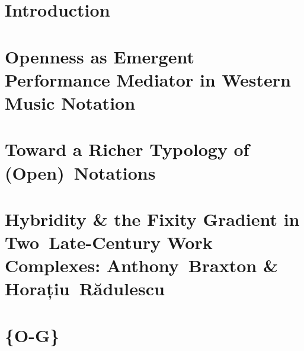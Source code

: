 \documentclass[12pt,fleqn,hyphens]{ucithesis}
\begin{document}
\preliminarypages


\setlength{\parskip}{0pt}
\setlength{\parindent}{15pt}

\chapter*{Introduction}


\chapter{Openness as Emergent Performance Mediator in Western Music Notation}


\chapter{Toward a Richer Typology of (Open)~Notations}


\chapter{Hybridity \& the Fixity Gradient in Two~Late-Century Work Complexes: Anthony~Braxton \& Horațiu~Rădulescu}


\chapter{\{O-G\}}


\newpage
{} %
\begingroup
{}
\setlength\bibitemsep{6.5pt} %

\nocite{*}
\printbibliography

\endgroup

\clearpage
{}






\begin{appendices}

\end{appendices}
\end{document}

